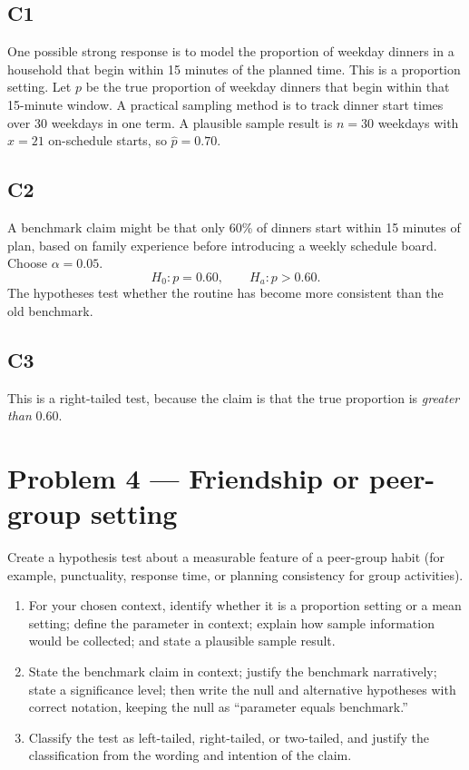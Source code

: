 	\subsection*{C1}
	One possible strong response is to model the proportion of weekday dinners in a household that begin within 15 minutes of the planned time. This is a proportion setting. Let \(p\) be the true proportion of weekday dinners that begin within that 15-minute window. A practical sampling method is to track dinner start times over 30 weekdays in one term. A plausible sample result is \(n=30\) weekdays with \(x=21\) on-schedule starts, so \(\hat p=0.70\).
	
	\subsection*{C2}
	A benchmark claim might be that only 60\% of dinners start within 15 minutes of plan, based on family experience before introducing a weekly schedule board. Choose \(\alpha=0.05\).
	\[
	H_0\colon p=0.60, \qquad H_a\colon p>0.60.
	\]
	The hypotheses test whether the routine has become more consistent than the old benchmark.
	
	\subsection*{C3}
	This is a right-tailed test, because the claim is that the true proportion is \emph{greater than} 0.60.


	\section{Problem 4 --- Friendship or peer-group setting}
	Create a hypothesis test about a measurable feature of a peer-group habit (for example, punctuality, response time, or planning consistency for group activities).
	
	\begin{enumerate}
		\item[(C1)] For your chosen context, identify whether it is a proportion setting or a mean setting; define the parameter in context; explain how sample information would be collected; and state a plausible sample result.
		\item[(C2)] State the benchmark claim in context; justify the benchmark narratively; state a significance level; then write the null and alternative hypotheses with correct notation, keeping the null as ``parameter equals benchmark.''
		\item[(C3)] Classify the test as left-tailed, right-tailed, or two-tailed, and justify the classification from the wording and intention of the claim.
	\end{enumerate}
	
